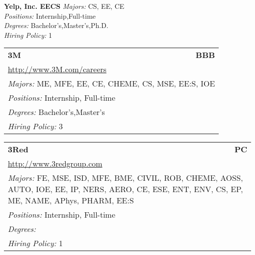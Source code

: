 \documentclass[twoside]{article}
\begin{document}
\begin{center}
\begin{multicols}{2}
\begin{minipage}{.95\columnwidth}{\Large\bf Yelp, Inc. \hfill EECS}
    \emph{Majors:} CS, EE, CE\\
    \emph{Positions:} Internship,Full-time\\
    \emph{Degrees:} Bachelor's,Master's,Ph.D.\\
    \emph{Hiring Policy:} 1\\
\end{minipage}
 \end{multicols}\end{center}
    \startcompanysection
    \begin{center}\begin{multicols}{3}
    \begin{FlushLeft}
    \begin{minipage}{\columnwidth}\begin{tabularx}{.95\columnwidth}{Xr}
                 {\Large\bf 3M} & {\Large\bf BBB}\\
    \multicolumn{2}{p{.95\columnwidth}}{\url{http://www.3M.com/careers}}\\
    \multicolumn{2}{p{.95\columnwidth}}{\emph{Majors:} ME, MFE, EE, CE, CHEME, CS, MSE, EE:S, IOE}\\
    \multicolumn{2}{p{.95\columnwidth}}{\emph{Positions:} Internship, Full-time}\\
    \multicolumn{2}{p{.95\columnwidth}}{\emph{Degrees:} Bachelor's,Master's}\\
    \multicolumn{2}{p{.95\columnwidth}}{\emph{Hiring Policy:} 3}\\
    \end{tabularx}
    
\end{minipage}
 
\begin{minipage}{\columnwidth}\begin{tabularx}{.95\columnwidth}{Xr}
                 {\Large\bf 3Red} & {\Large\bf PC}\\
    \multicolumn{2}{p{.95\columnwidth}}{\url{http://www.3redgroup.com}}\\
    \multicolumn{2}{p{.95\columnwidth}}{\emph{Majors:} FE, MSE, ISD, MFE, BME, CIVIL, ROB, CHEME, AOSS, AUTO, IOE, EE, IP, NERS, AERO, CE, ESE, ENT, ENV, CS, EP, ME, NAME, APhys, PHARM, EE:S}\\
    \multicolumn{2}{p{.95\columnwidth}}{\emph{Positions:} Internship, Full-time}\\
    \multicolumn{2}{p{.95\columnwidth}}{\emph{Degrees:} }\\
    \multicolumn{2}{p{.95\columnwidth}}{\emph{Hiring Policy:} 1}\\
    \end{tabularx}
    

\end{minipage}
\end{FlushLeft}
\end{multicols}
\end{center}
\end{document}
